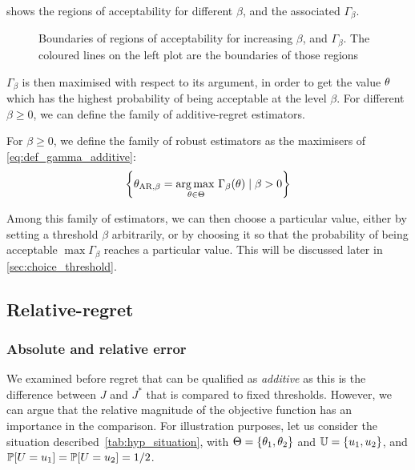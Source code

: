 \documentclass[../../Main_ManuscritThese.tex]{subfiles}
\newcommand\imgpath{/home/victor/acadwriting/Manuscrit/Text/Chapter3/img/}
\begin{document}
   shows the regions of acceptability
  for different $\beta$, and the associated $\Gamma_{\beta}$.

\begin{figure}[ht]
  \centering
  
  \caption[Regions of $\beta$-acceptability]{\label{fig:gamma_beta_increasing} Boundaries of regions of acceptability for increasing $\beta$, and $\Gamma_{\beta}$. The coloured lines on the left plot are the boundaries of those regions}
\end{figure}


$\Gamma_{\beta}$ is then maximised with respect to its argument, in
order to get the value $\theta$ which has the highest probability of
being acceptable at the level $\beta$. For different $\beta \geq 0$,
we can define the family of additive-regret estimators.

  
  \begin{definition}
    \label{def:AR_family}
    For $\beta \geq 0$, we define the family of robust estimators as
    the maximisers of \cref{eq:def_gamma_additive}:
    \begin{equation}
      \label{eq:def_AR_family}
      \left\{\estimtxt{\kk}{AR,\beta} = \argmax_{\kk\in\Kspace} \Gamma_{\beta}(\kk) \mid \beta > 0\right\} %
    \end{equation}
  \end{definition}
  Among this family of estimators, we can then choose a particular
  value, either by setting a threshold $\beta$ arbitrarily, or by
  choosing it so that the probability of being acceptable
  $\max \Gamma_{\beta}$ reaches a particular value. This will be
  discussed later in \cref{sec:choice_threshold}.


  \subsection{Relative-regret}
  \subsubsection{Absolute and relative error}
  \label{ssec:hyp_situation}
  We examined before regret that can be qualified as \emph{additive}
  as this is the difference between $J$ and $J^*$ that is compared to
  fixed thresholds.  However, we can argue that the relative magnitude
  of the objective function has an importance in the comparison. For
  illustration purposes, let us consider the situation
  described~\cref{tab:hyp_situation}, with
  $\Theta = \{\theta_1, \theta_2\}$ and $\mathbb{U} = \{u_1, u_2\}$, and
  $\mathbb{P}[U = u_1] =\mathbb{P}[U = u_2]= 1/2$.
\end{document}
